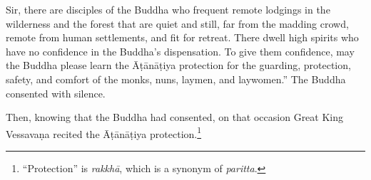 \documentclass[12pt,openany]{book}%
\begin{document}
Sir, there are disciples of the Buddha who frequent remote lodgings in the wilderness and the forest that are quiet and still, far from the madding crowd, remote from human settlements, and fit for retreat. There dwell high spirits who have no confidence in the Buddha’s dispensation. To give them confidence, may the Buddha please learn the \textsanskrit{Āṭānāṭiya} protection for the guarding, protection, safety, and comfort of the monks, nuns, laymen, and laywomen.” The Buddha consented with silence. 

Then, knowing that the Buddha had consented, on that occasion Great King \textsanskrit{Vessavaṇa} recited the \textsanskrit{Āṭānāṭiya} protection.\footnote{“Protection” is \textit{\textsanskrit{rakkhā}}, which is a synonym of \textit{paritta}. } 
\end{document}
